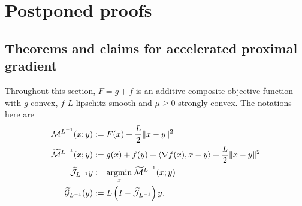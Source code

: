 \documentclass[12pt]{article}
\begin{document}



\appendix
\section{Postponed proofs}

\subsection{Theorems and claims for accelerated proximal gradient}\label{app:sec:thm-claim-acc-prox-grad}
    Throughout this section, $F = g + f$ is an additive composite objective function with $g$ convex, $f$ $L$-lipschitz smooth and $\mu \ge0$ strongly convex. 
    The notations here are 
    \begin{align*}
        \mathcal M^{L^{-1}}(x; y) 
        &:= 
        F(x) + \frac{L}{2}\Vert x - y\Vert^2
        \\
        \widetilde{ \mathcal M}^{L^{-1}}(x; y) 
        &:= g(x) + f(y) 
        + 
        \left\langle \nabla f(x), x - y\right\rangle 
        + 
        \frac{L}{2}\Vert x - y\Vert^2
        \\
        \widetilde{\mathcal J}_{L^{-1}}y 
        &:= \mathop{\rm argmin}\limits_{x} \widetilde{\mathcal M}^{L^{-1}}(x; y)
        \\
        \widetilde{\mathcal G}_{L^{-1}}(y)
        &:= L\left(I - \widetilde{\mathcal J}_{L^{-1}}\right)y. 
    \end{align*}
\end{document}
